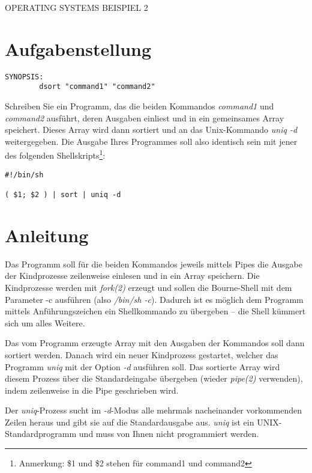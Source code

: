 \documentclass{article}
\begin{document}
\begin{center}
\begin{Large}
OPERATING SYSTEMS BEISPIEL 2
\end{Large}
\end{center}




\section*{Aufgabenstellung}


\begin{verbatim}
SYNOPSIS:
        dsort "command1" "command2"
\end{verbatim}

Schreiben Sie ein Programm, das die beiden Kommandos \emph{command1}
und \emph{command2} ausführt, deren Ausgaben einliest und in ein
gemeinsames Array speichert. Dieses Array wird dann sortiert und an
das Unix-Kommando \emph{uniq -d} weitergegeben. Die Ausgabe Ihres
Programmes soll also identisch sein mit jener des folgenden
Shellskripts\footnote{Anmerkung: \$1 und \$2 stehen für command1 und
command2}:

\begin{verbatim}
#!/bin/sh

( $1; $2 ) | sort | uniq -d
\end{verbatim}

\section*{Anleitung}

Das Programm soll für die beiden Kommandos jeweils mittels Pipes die
Ausgabe der Kindprozesse zeilenweise einlesen und in ein Array
speichern. Die Kindprozesse werden mit \emph{fork(2)} erzeugt und
sollen die Bourne-Shell mit dem Parameter -c ausführen (also
\emph{/bin/sh -c}). Dadurch ist es möglich dem Programm mittels
Anführungszeichen ein Shellkommando zu übergeben – die Shell kümmert
sich um alles Weitere.

Das vom Programm erzeugte Array mit den Ausgaben der Kommandos soll
dann sortiert werden. Danach wird ein neuer Kindprozess gestartet,
welcher das Programm \emph{uniq} mit der Option \emph{-d} ausführen
soll. Das sortierte Array wird diesem Prozess über die Standardeingabe
übergeben (wieder \emph{pipe(2)} verwenden), indem zeilenweise in die
Pipe geschrieben wird.

Der \emph{uniq}-Prozess sucht im \emph{-d}-Modus alle mehrmals
nacheinander vorkommenden Zeilen heraus und gibt sie auf die
Standardausgabe aus. \emph{uniq} ist ein UNIX-Standardprogramm und
muss von Ihnen nicht programmiert werden.
\end{document}
